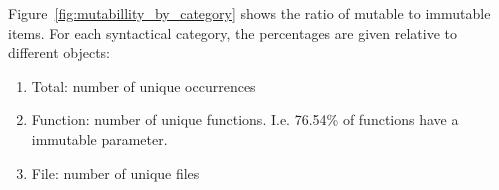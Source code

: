 \documentclass{book}
\theoremstyle{definition}
\begin{document}


Figure~\ref{fig:mutabillity_by_category} shows the ratio of mutable to immutable items. For each syntactical category, the percentages are given relative to different objects:

\begin{enumerate}
  \item Total: number of unique occurrences
  \item Function: number of unique functions. I.e. 76.54\% of functions have a immutable parameter.
  \item File: number of unique files
\end{enumerate}
\end{document}
